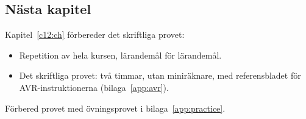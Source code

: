 \subsection*{Nästa kapitel}
Kapitel~\ref{c12:ch} förbereder det skriftliga provet:
\begin{itemize}
  \item Repetition av hela kursen, lärandemål för lärandemål.
  \item Det skriftliga provet: två timmar, utan miniräknare, med referensbladet för
    AVR-instruktionerna (bilaga~\ref{app:avr}).
\end{itemize}
Förbered provet med övningsprovet i bilaga~\ref{app:practice}.
